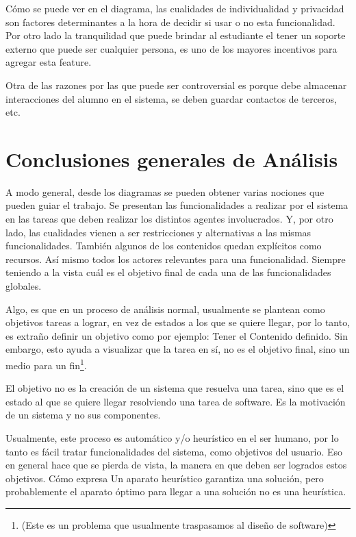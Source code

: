         \par Cómo se puede ver en el diagrama, las cualidades de individualidad y privacidad son factores determinantes a la hora de decidir si usar o no esta funcionalidad. Por otro lado la tranquilidad que puede brindar al estudiante el tener un soporte externo que puede ser cualquier persona, es uno de los mayores incentivos para agregar esta feature.
        \par Otra de las razones por las que puede ser controversial es porque debe almacenar interacciones del alumno en el sistema, se deben guardar contactos de terceros, etc.

\section{Conclusiones generales de Análisis}
    \par A modo general, desde los diagramas se pueden obtener varias nociones que pueden guiar el trabajo. Se presentan las funcionalidades a realizar por el sistema en las tareas que deben realizar los distintos agentes involucrados. Y, por otro lado, las cualidades vienen a ser restricciones y alternativas a las mismas funcionalidades. También algunos de los contenidos quedan explícitos como recursos. Así mismo todos los actores relevantes para una funcionalidad. Siempre teniendo a la vista cuál es el objetivo final de cada una de las funcionalidades globales.
    
    \par Algo, es que en un proceso de análisis normal, usualmente se plantean como objetivos \guillemotleft tareas \guillemotright a lograr, en vez de estados a los que se quiere llegar, por lo tanto, es extraño definir un objetivo como por ejemplo: Tener el Contenido definido. Sin embargo, esto ayuda a visualizar que la tarea en sí, no es el objetivo final, sino un medio para un fin\footnote{(Este es un problema que usualmente traspasamos al diseño de software)}. 
    \par El objetivo no es la creación de un sistema que resuelva una tarea, sino que es el estado al que se quiere llegar resolviendo una tarea de software. Es la motivación de un sistema y no sus componentes. 
    \par Usualmente, este proceso es automático y/o heurístico en el ser humano, por lo tanto es fácil tratar funcionalidades del sistema, como objetivos del usuario. Eso en general hace que se pierda de vista, la manera en que deben ser logrados estos objetivos. Cómo expresa \cite{Romanycia1985} \guillemotleft Un aparato heurístico garantiza una solución, pero probablemente el aparato óptimo para llegar a una solución no es una heurística\guillemotright.
        
